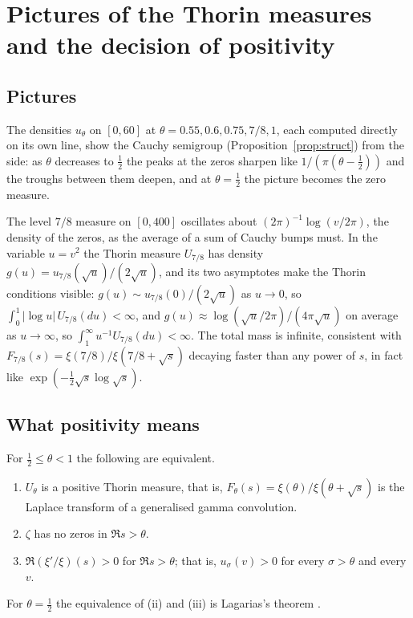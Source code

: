 \section{Pictures of the Thorin measures and the decision of positivity}\label{cx:sec:pictures}

\subsection{Pictures}

The densities $u_\theta$ on $[0,60]$ at $\theta=0.55,0.6,0.75,7/8,1$, each computed directly on its own line, show the Cauchy semigroup (Proposition~\ref{prop:struct}) from the side: as $\theta$ decreases to $\tfrac12$ the peaks at the zeros sharpen like $1/(\pi(\theta-\tfrac12))$ and the troughs between them deepen, and at $\theta=\tfrac12$ the picture becomes the zero measure.

The level $7/8$ measure on $[0,400]$ oscillates about $(2\pi)^{-1}\log(v/2\pi)$, the density of the zeros, as the average of a sum of Cauchy bumps must. In the variable $u=v^2$ the Thorin measure $U_{7/8}$ has density $g(u)=u_{7/8}(\sqrt u)/(2\sqrt u)$, and its two asymptotes make the Thorin conditions visible: $g(u)\sim u_{7/8}(0)/(2\sqrt u)$ as $u\to0$, so $\int_0^1|\log u|\,U_{7/8}(du)<\infty$, and $g(u)\approx\log(\sqrt u/2\pi)/(4\pi\sqrt u)$ on average as $u\to\infty$, so $\int_1^\infty u^{-1}U_{7/8}(du)<\infty$. The total mass is infinite, consistent with $F_{7/8}(s)=\xi(7/8)/\xi(7/8+\sqrt s)$ decaying faster than any power of $s$, in fact like $\exp(-\tfrac12\sqrt s\log\sqrt s)$.

\subsection{What positivity means}

\begin{theorem}[positivity]\label{cx:thm:positivity}
For $\tfrac12\le\theta<1$ the following are equivalent.
\begin{enumerate}
\item[(i)] $U_\theta$ is a positive Thorin measure, that is, $F_\theta(s)=\xi(\theta)/\xi(\theta+\sqrt s)$ is the Laplace transform of a generalised gamma convolution.
\item[(ii)] $\zeta$ has no zeros in $\Re s>\theta$.
\item[(iii)] $\Re(\xi'/\xi)(s)>0$ for $\Re s>\theta$; that is, $u_\sigma(v)>0$ for every $\sigma>\theta$ and every $v$.
\end{enumerate}
For $\theta=\tfrac12$ the equivalence of (ii) and (iii) is Lagarias's theorem \cite{Lagarias}.
\end{theorem}


